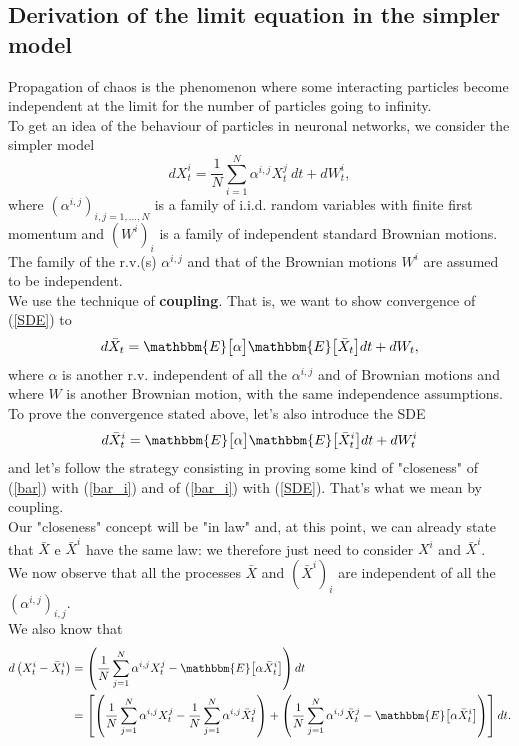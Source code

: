 \documentclass[11pt, a4paper]{article}
\begin{document}
\subsection{Derivation of the limit equation in the simpler model}
Propagation of chaos is the phenomenon where some interacting particles become independent at the limit for the number of particles going to infinity. \\
To get an idea of the behaviour of particles in neuronal networks, we consider the simpler model
\begin{equation} \label{SDE} dX^i_t = \frac{1}{N} \sum_{i = 1}^N \alpha^{i, j} X^j_t \ dt + dW^i_t, \end{equation} where $(\alpha^{i, j})_{i, j = 1, ..., N}$ is a family of i.i.d. random variables with finite first momentum and $(W^i)_i$ is a family of independent standard Brownian motions. The family of the r.v.(s) $\alpha^{i, j}$ and that of the Brownian motions $W^i$ are assumed to be independent. \\

We use the technique of \textbf{coupling}. That is, we want to show convergence of (\ref{SDE}) to \begin{equation} \label{bar} d \bar{X}_t = \mathbbm{E} \big[ \alpha \big] \mathbbm{E} \big[ \bar{X}_t \big] dt + d W_t, \end{equation} where $\alpha$ is another r.v. independent of all the $\alpha^{i, j}$ and of Brownian motions and where $W$ is another Brownian motion, with the same independence assumptions. To prove the convergence stated above, let's also introduce the SDE \begin{equation} \label{bar_i} d \bar{X}^i_t = \mathbbm{E} \big[ \alpha \big] \mathbbm{E} \big[ \bar{X}^i_t \big] dt + d W^i_t \end{equation} and let's follow the strategy consisting in proving some kind of "closeness" of (\ref{bar}) with (\ref{bar_i}) and of (\ref{bar_i}) with (\ref{SDE}). That's what we mean by coupling. \\
Our "closeness" concept will be "in law" and, at this point, we can already state that $\bar{X}$ e $\bar{X}^i$ have the same law: we therefore just need to consider $X^i$ and $\bar{X}^i$. \\

We now observe that all the processes $\bar{X}$ and $(\bar{X}^i)_i$ are independent of all the $(\alpha^{i,j})_{i,j}$. \\
We also know that \[ \begin{aligned} d \left( X^i_t - \bar{X}^i_t \right) &= \left( \frac{1}{N} \sum_{j = 1}^N \alpha^{i, j} X^j_t - \mathbbm{E} \big[ \alpha \bar{X}^i_t \big] \right) dt \\ &= \left[ \left( \frac{1}{N} \sum_{j = 1}^N \alpha^{i, j} X^j_t - \frac{1}{N} \sum_{j = 1}^N \alpha^{i, j} \bar{X}^j_t \right) + \left(\frac{1}{N} \sum_{j = 1}^N \alpha^{i, j} \bar{X}^j_t - \mathbbm{E} \big[ \alpha \bar{X}^i_t \big] \right) \right] dt. \end{aligned} \]
\end{document}
